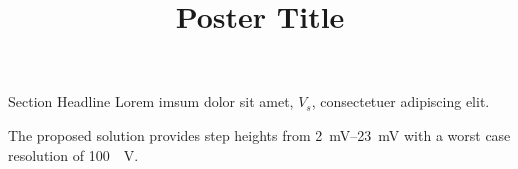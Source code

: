 \documentclass{tugPoster}
\title{Poster Title}
\begin{document}
	\maketitle

	\begin{IPTblock}[twocol]{Section Headline}
		\lipsum[1]
		Lorem imsum dolor sit amet, $V_s$, consectetuer adipiscing elit.

		The proposed solution provides step heights from \SIrange{2}{23}{\milli \volt} with a worst case resolution of \SI{100}{\mu \volt}.
	\IPTcolbreak
		\lipsum[2]
		\lipsum[4]
	\end{IPTblock}
\end{document}
